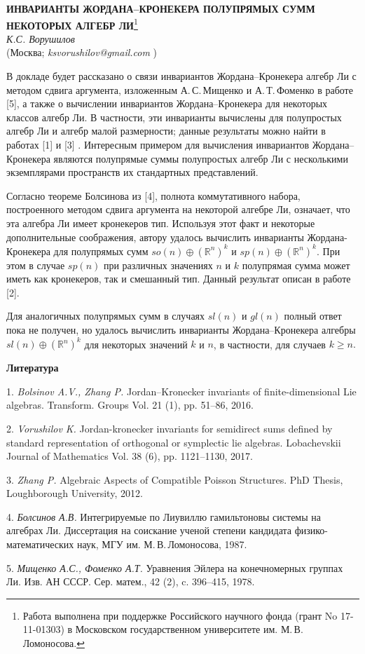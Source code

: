 \begin{center}{ \bf  ИНВАРИАНТЫ ЖОРДАНА--КРОНЕКЕРА ПОЛУПРЯМЫХ СУММ НЕКОТОРЫХ АЛГЕБР ЛИ}\footnote{Работа выполнена при поддержке Российского научного фонда (грант No 17-11-01303) в Московском государственном университете им. М.\,В. Ломоносова.}\\
{\it К.С. Ворушилов } \\
(Москва; {\it ksvorushilov@gmail.com} )
\end{center}

В докладе будет рассказано о связи инвариантов Жорда\-на--Кронекера алгебр Ли с методом сдвига аргумента, изложенным А.\,С.\,Мищенко и А.\,Т.\,Фоменко в работе [5], а также о вычислении инвариантов Жордана--Кронекера для некоторых классов алгебр Ли. В частности, эти инварианты вычислены для полупростых алгебр Ли и алгебр малой размерности; данные результаты можно найти в работах [1] и [3] . Интересным примером для вычисления инвариантов Жордана--Кронекера являются полупрямые суммы полупростых алгебр Ли с несколькими экземплярами пространств их стандартных представлений.

Согласно теореме Болсинова из [4], полнота коммутативного набора, построенного методом сдвига аргумента на некоторой алгебре Ли, означает, что эта алгебра Ли имеет кронекеров тип. Используя этот факт и некоторые дополнительные соображения, автору удалось вычислить инварианты Жордана-Кронекера для полупрямых сумм  $so(n)\oplus (\mathbb{R}^n)^k$ и  $sp(n)\oplus (\mathbb{R}^n)^k.$ При этом в случае $sp(n)$ при различных значениях $n$ и $k$ полупрямая сумма может иметь как кронекеров, так и смешанный тип. Данный результат описан в работе [2].

Для аналогичных полупрямых сумм в случаях $sl(n)$ и $gl(n)$ полный ответ пока не получен, но удалось вычислить инварианты Жордана--Кронекера алгебры $sl(n)\oplus (\mathbb{R}^n)^k$ для некоторых значений $k$ и $n$, в частности, для случаев $k\geq n.$



\smallskip \centerline{\bf Литература}\nopagebreak

1. {\it Bolsinov A.V., Zhang P.} Jordan–Kronecker invariants of finite-dimensional Lie algebras. Transform. Groups Vol. 21 (1), pp. 51--86, 2016.

2. {\it Vorushilov K.} Jordan-kronecker invariants for semidirect sums defined by standard representation of orthogonal or symp\-lec\-tic lie algebras. Lobachevskii Journal of Mathematics Vol. 38 (6), pp. 1121--1130, 2017.

3. {\it Zhang P.} Algebraic Aspects of Compatible Poisson Struc\-tures. PhD Thesis, Loughborough University, 2012.

4. {\it Болсинов А.В.} Интегрируемые по Лиувиллю гамильтоновы системы на алгебрах Ли. Диссертация на соискание ученой степени кандидата физико-математических наук, МГУ им. М.\,В.\,Ломоносова, 1987.

5. {\it Мищенко А.С., Фоменко А.Т.} Уравнения Эйлера на конечномерных группах Ли. Изв. АН СССР. Сер. матем., 42 (2), c. 396–415, 1978.


